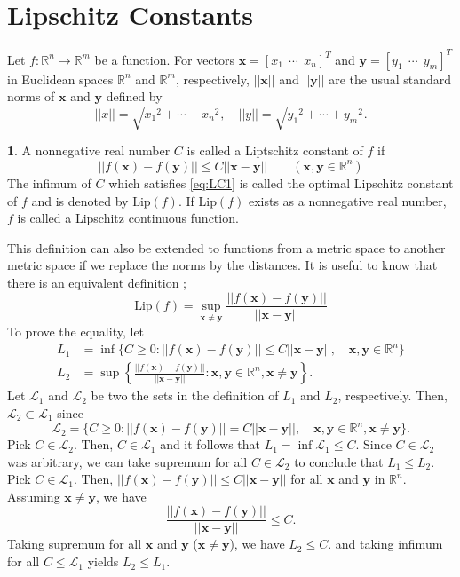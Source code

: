 \documentclass[12pt]{report}
\numberwithin{figure}{chapter}
\theoremstyle{plain}
\theoremstyle{definition}
\newtheorem{definition}[theorem]{\protect\definitionname}
\theoremstyle{corollary}
\theoremstyle{definition}
\theoremstyle{plain}
\theoremstyle{definition}
\theoremstyle{plain}
\providecommand{\definitionname}{Definition}
\newcommand\bx{\ensuremath{\boldsymbol x}}
\newcommand\by{\ensuremath{\boldsymbol y}}
\newcommand\lip{\ensuremath{\text{Lip}}}
\begin{document}
\section{Lipschitz Constants}
Let \(f:\mathbb R^n\to\mathbb R^m\) be a function.
For vectors \(\bx=[x_1\:\:\cdots\:\:x_n]^T\) and \(\by=[y_1\:\:\cdots\:\:y_m]^T\) in Euclidean spaces \(\mathbb R^n\) and \(\mathbb R^m\), respectively, \(||\bx||\) and \(||\by||\) are the usual standard norms of \bx{} and \by{} defined by
\begin{equation}\label{eq:euclidean_norm}
||x||=\sqrt{{x_1}^2+\cdots+{x_n}^2},\quad ||y||=\sqrt{{y_1}^2+\cdots+{y_m}^2}.
\end{equation}

\begin{definition}\label{LC}
A nonnegative real number \(C\) is called a Liptschitz constant of \(f\) if
\begin{equation}\label{eq:LC1}
||f(\bx)-f(\by)||\le C||\bx-\by||\qquad(\bx,\by\in\mathbb R^n)
\end{equation}
The infimum of \(C\) which satisfies \eqref{eq:LC1} is called the optimal Lipschitz constant of \(f\) and is denoted by \(\lip(f)\).
If \(\lip(f)\) exists as a nonnegative real number, \(f\) is called a Lipschitz continuous function.
\end{definition}

This definition can also be extended to functions from a metric space to another metric space if we replace the norms by the distances.
It is useful to know that there is an equivalent definition ;
\begin{equation}\label{eq:LC2}
\lip(f)=\sup_{\bx\neq\by}\frac{||f(\bx)-f(\by)||}{||\bx-\by||}
\end{equation}
To prove the equality, let
\begin{equation}\label{eq:equivalent_def}
\begin{aligned}
L_1&=\inf\{C\ge0:||f(\bx)-f(\by)||\le C||\bx-\by||,\quad\bx,\by\in\mathbb R^n\}\\
L_2&=\sup\left\{\frac{||f(\bx)-f(\by)||}{||\bx-\by||}:\bx,\by\in\mathbb R^n,\bx\neq\by\right\}.
\end{aligned}
\end{equation}
Let \(\mathcal L_1\) and \(\mathcal L_2\) be two the sets in the definition of \(L_1\) and \(L_2\), respectively.
Then, \(\mathcal L_2\subset\mathcal L_1\) since
\[\mathcal L_2=\{C\ge0:||f(\bx)-f(\by)||=C||\bx-\by||,\quad\bx,\by\in\mathbb R^n,\bx\neq\by\}.\]
Pick \(C\in\mathcal L_2\).
Then, \(C\in\mathcal L_1\) and it follows that \(L_1=\inf\mathcal L_1\le C\).
Since \(C\in\mathcal L_2\) was arbitrary, we can take supremum for all \(C\in\mathcal L_2\) to conclude that \(L_1\le L_2\).
Pick \(C\in\mathcal L_1\).
Then, \(||f(\bx)-f(\by)||\le C||\bx-\by||\) for all \(\bx\) and \(\by\) in \(\mathbb R^n\).
Assuming \(\bx\neq \by\), we have
\[
\frac{||f(\bx)-f(\by)||}{||\bx-\by||}\le C.
\]
Taking supremum for all \bx{} and \by{} (\(\bx\neq\by\)), we have \(L_2\le C.\) and taking infimum for all \(C\le\mathcal L_1\) yields \(L_2\le L_1\).
\end{document}
